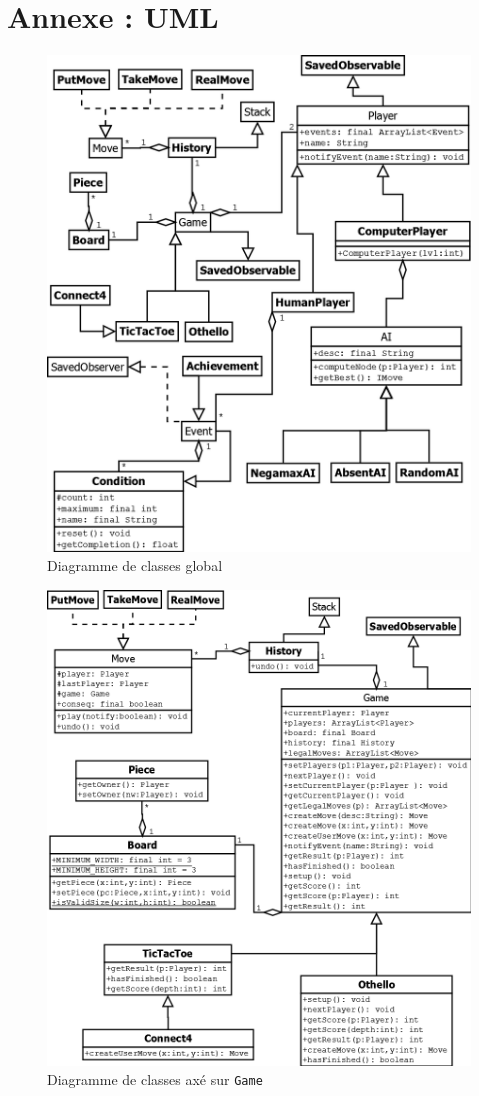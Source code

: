 \section{Annexe : UML}

\begin{figure}[ht]
\centering
\includegraphics[width=12cm]{../uml_global.png}
\caption{Diagramme de classes global}
\label{fig:umlGlobal}
\end{figure}
\begin{figure}[ht]
\centering
\includegraphics[width=16cm]{../uml_Game.png}
\caption{Diagramme de classes axé sur \texttt{Game}}
\label{fig:umlGame}
\end{figure}
